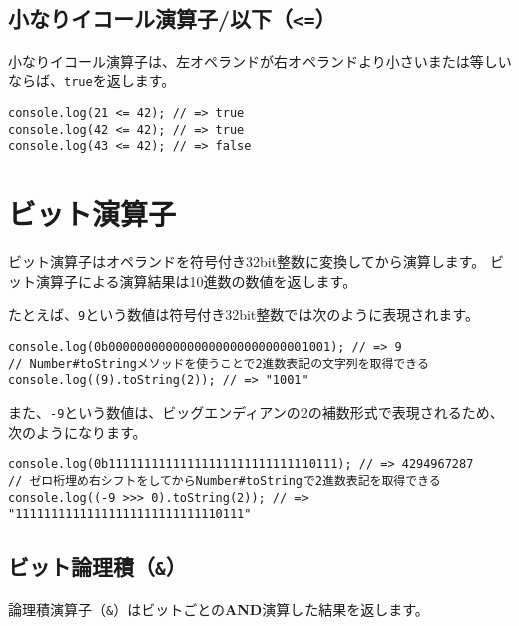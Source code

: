 \hypertarget{less-than-equal}{%
\subsection{\texorpdfstring{小なりイコール演算子/以下（\texttt{\textless{}=}）}{小なりイコール演算子/以下（\textless{}=）}}\label{less-than-equal}}

小なりイコール演算子は、左オペランドが右オペランドより小さいまたは等しいならば、\texttt{true}を返します。

\begin{lstlisting}
console.log(21 <= 42); // => true
console.log(42 <= 42); // => true
console.log(43 <= 42); // => false
\end{lstlisting}

\hypertarget{bit-operator}{%
\section{ビット演算子}\label{bit-operator}}

ビット演算子はオペランドを符号付き32bit整数に変換してから演算します。
ビット演算子による演算結果は10進数の数値を返します。

たとえば、\texttt{9}という数値は符号付き32bit整数では次のように表現されます。

\begin{lstlisting}
console.log(0b0000000000000000000000000001001); // => 9
// Number#toStringメソッドを使うことで2進数表記の文字列を取得できる
console.log((9).toString(2)); // => "1001"
\end{lstlisting}

また、\texttt{-9}という数値は、ビッグエンディアンの2の補数形式で表現されるため、次のようになります。

\begin{lstlisting}
console.log(0b11111111111111111111111111110111); // => 4294967287
// ゼロ桁埋め右シフトをしてからNumber#toStringで2進数表記を取得できる
console.log((-9 >>> 0).toString(2)); // => "11111111111111111111111111110111"
\end{lstlisting}

\hypertarget{bit-and}{%
\subsection{\texorpdfstring{ビット論理積（\texttt{\&}）}{ビット論理積（\&）}}\label{bit-and}}

論理積演算子（\texttt{\&}）はビットごとの\textbf{AND}演算した結果を返します。

